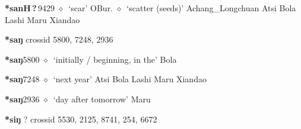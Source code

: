   \begin{list}{}{\leftmargin=1.5em \itemindent=-1.5em}
  \item {\footnotesize \textbf{*sanH\,?\,}}{\tiny 9429}
         $\diamond$~`scar'
         OBur. 
\hspace{1ex}
         $\diamond$~`scatter (seeds)'
         Achang\_Longchuan 
\hspace{1ex}
         Atsi 
\hspace{1ex}
         Bola 
\hspace{1ex}
         Lashi 
\hspace{1ex}
         Maru 
\hspace{1ex}
         Xiandao 
  \end{list}
\item
\textbf{*saŋ}
  {\tiny crossid 5800, 7248, 2936}
  \begin{list}{}{\leftmargin=1.5em \itemindent=-1.5em}
  \item {\footnotesize \textbf{*saŋ}}{\tiny 5800}
         $\diamond$~`initially / beginning, in the'
         Bola 
  \item {\footnotesize \textbf{*saŋ}}{\tiny 7248}
\hspace{1ex}
         $\diamond$~`next year'
         Atsi 
\hspace{1ex}
         Bola 
\hspace{1ex}
         Lashi 
\hspace{1ex}
         Maru 
\hspace{1ex}
         Xiandao 
  \item {\footnotesize \textbf{*saŋ}}{\tiny 2936}
\hspace{1ex}
         $\diamond$~`day after tomorrow'
         Maru 
  \end{list}
\item
\textbf{*siŋ}
?
  {\tiny crossid 5530, 2125, 8741, 254, 6672}
